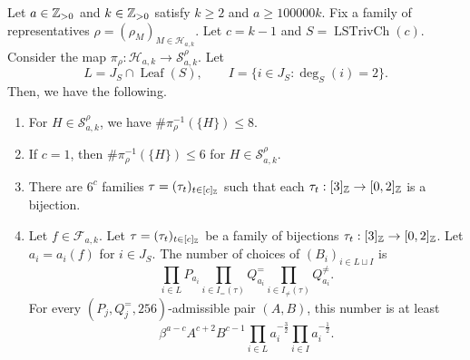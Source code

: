 \begin{lemma}\label{lem:forget-markings}
Let $a\in\mathbb Z_{>0}$ and $k\in\mathbb Z_{>0}$ satisfy $k\ge2$ and $a\ge100000k$.
Fix a family of representatives $\rho=(\rho_M)_{M\in\mathcal H_{a,k}}$.
Let $c=k-1$ and $S=\operatorname{LSTrivCh}(c)$. Consider the map $\pi_\rho\colon\mathcal H_{a,k}\to\mathcal S_{a,k}^\rho$.
Let
\[
 L=J_S\cap\operatorname{Leaf}(S),\qquad I=\{i\in J_S:\deg_S(i)=2\}.
\]
Then, we have the following.
\begin{enumerate}
\item\label{c:forget-markings-eight} For $H\in\mathcal S_{a,k}^\rho$,
we have $\#\pi_\rho^{-1}(\{H\})\le8$.
\item\label{c:forget-markings-six} If $c=1$, then
$\#\pi_\rho^{-1}(\{H\})\le6$ for $H\in\mathcal S_{a,k}^\rho$.
\item\label{c:marked-color-count} There are $6^c$ families $\tau=(\tau_t)_{t\in[c]_{\mathbb Z}}$ such that each $\tau_t:[3]_{\mathbb Z}\to[0,2]_{\mathbb Z}$ is a bijection.
\item\label{c:marked-block-count} Let $f\in\mathcal F_{a,k}$.
Let $\tau=(\tau_t)_{t\in[c]_{\mathbb Z}}$ be a family of bijections $\tau_t:[3]_{\mathbb Z}\to[0,2]_{\mathbb Z}$.
Let $a_i=a_i(f)$ for $i\in J_S$.
The number of choices of $(B_i)_{i\in L\sqcup I}$ is
\[
 \prod_{i\in L}P_{a_i}
 \prod_{i\in I_=(\tau)}Q_{a_i}^{=}
 \prod_{i\in I_{\ne}(\tau)}Q_{a_i}^{\ne}.
\]
For every $(P_j,Q_j^{=},256)$-admissible pair $(A,B)$, this number is at least
\[
 \beta^{a-c}A^{c+2}B^{c-1}
 \prod_{i\in L}a_i^{-\frac32}
 \prod_{i\in I}a_i^{-\frac12}.
\]
\end{enumerate}
\end{lemma}
